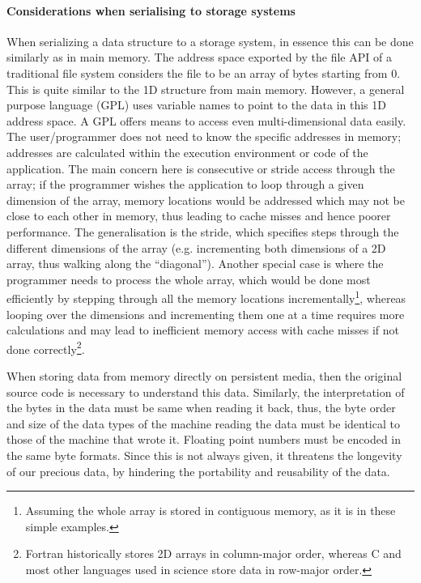 \paragraph{Considerations when serialising to storage systems}


When serializing a data structure to a storage system, in essence this can be done similarly as in main memory.
The address space exported by the file API of a traditional file system considers the file to be an array of bytes starting from 0.
This is quite similar to the 1D structure from main memory.
However, a general purpose language (GPL) uses variable names to point to the data in this 1D address space.
A GPL offers means to access even multi-dimensional data easily.
The user/programmer does not need to know the specific addresses in memory; addresses are calculated within the execution environment or code of the application.
The main concern here is consecutive or stride access through the array; if the programmer wishes the application to loop through a given dimension of the array, memory locations would be addressed which may not be close to each other in memory, thus leading to cache misses and hence poorer performance.
The generalisation is the stride, which specifies steps through the different dimensions of the array (e.g. incrementing both dimensions of a 2D array, thus walking along the ``diagonal'').
Another special case is where the programmer needs to process the whole array, which would be done most efficiently by stepping through all the memory locations incrementally\footnote{Assuming the whole array is stored in contiguous memory, as it is in these simple examples.},
whereas looping over the dimensions and incrementing them one at a time requires more calculations and may lead to inefficient memory access with cache misses if not done correctly\footnote{Fortran historically stores 2D arrays in column-major order, whereas C and most other languages used in science store data in row-major order.}.


\medskip

When storing data from memory directly on persistent media, then the original source code is necessary to understand this data.
Similarly, the interpretation of the bytes in the data must be same when reading it back, thus, the byte order and size of the data types of the machine reading the data must be identical to those of the machine that wrote it.  Floating point numbers must be encoded in the same byte formats.
Since this is not always given, it threatens the longevity of our precious data, by hindering the portability and reusability of the data.

